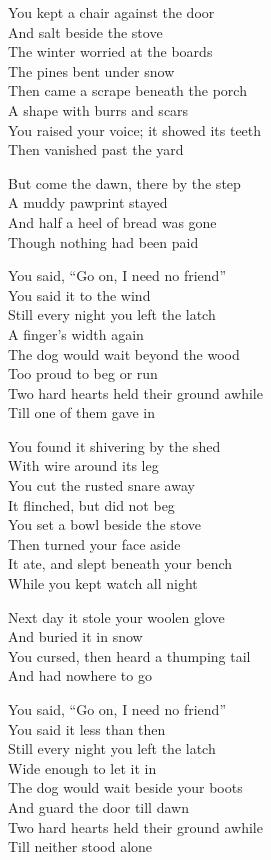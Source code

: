 \begin{lyrics}
You kept a chair against the door\\
And salt beside the stove\\
The winter worried at the boards\\
The pines bent under snow\\
Then came a scrape beneath the porch\\
A shape with burrs and scars\\
You raised your voice; it showed its teeth\\
Then vanished past the yard

But come the dawn, there by the step\\
A muddy pawprint stayed\\
And half a heel of bread was gone\\
Though nothing had been paid

You said, “Go on, I need no friend”\\
You said it to the wind\\
Still every night you left the latch\\
A finger’s width again\\
The dog would wait beyond the wood\\
Too proud to beg or run\\
Two hard hearts held their ground awhile\\
Till one of them gave in

You found it shivering by the shed\\
With wire around its leg\\
You cut the rusted snare away\\
It flinched, but did not beg\\
You set a bowl beside the stove\\
Then turned your face aside\\
It ate, and slept beneath your bench\\
While you kept watch all night

Next day it stole your woolen glove\\
And buried it in snow\\
You cursed, then heard a thumping tail\\
And had nowhere to go

You said, “Go on, I need no friend”\\
You said it less than then\\
Still every night you left the latch\\
Wide enough to let it in\\
The dog would wait beside your boots\\
And guard the door till dawn\\
Two hard hearts held their ground awhile\\
Till neither stood alone


\end{lyrics}

